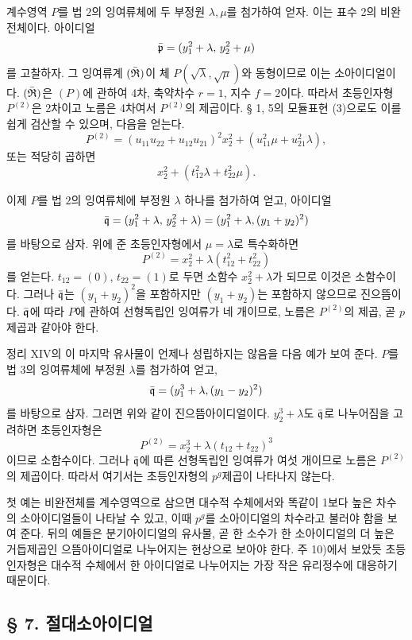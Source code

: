 계수영역 \(P\)를 법 \(2\)의 잉여류체에 두 부정원 \(\lambda,\mu\)를 첨가하여 얻자. 이는 표수 2의 비완전체이다. 아이디얼
\[
 \bar{\mathfrak p}=(y_1^2+\lambda,\,y_2^2+\mu)
\]
를 고찰하자. 그 잉여류계 \((\bar{\mathfrak{R}})\)이 체 \(P(\sqrt\lambda,\sqrt\mu)\)와 동형이므로 이는 소아이디얼이다. \((\bar{\mathfrak{R}})\)은 \((P)\)에 관하여 4차, 축약차수 \(r=1\), 지수 \(f=2\)이다. 따라서 초등인자형 \(P^{(2)}\)은 2차이고 노름은 4차여서 \(P^{(2)}\)의 제곱이다. § 1, 5의 모듈표현 (3)으로도 이를 쉽게 검산할 수 있으며, 다음을 얻는다.
\[
 P^{(2)}=(u_{11}u_{22}+u_{12}u_{21})^2x_2^2+(u_{11}^2\mu+u_{21}^2\lambda),
\]
또는 적당히 곱하면
\[
 x_2^2+(t_{12}^2\lambda+t_{22}^2\mu).
\]

이제 \(P\)를 법 \(2\)의 잉여류체에 부정원 \(\lambda\) 하나를 첨가하여 얻고, 아이디얼
\[
 \bar{\mathfrak q}=(y_1^2+\lambda,\,y_2^2+\lambda)
              =(y_1^2+\lambda,(y_1+y_2)^2)
\]
를 바탕으로 삼자. 위에 준 초등인자형에서 \(\mu=\lambda\)로 특수화하면
\[
 P^{(2)}=x_2^2+\lambda(t_{12}^2+t_{22}^2)
\]
를 얻는다. \(t_{12}=(0)\), \(t_{22}=(1)\)로 두면 소함수 \(x_2^2+\lambda\)가 되므로 이것은 소함수이다. 그러나 \(\bar{\mathfrak q}\)는 \((y_1+y_2)^2\)을 포함하지만 \((y_1+y_2)\)는 포함하지 않으므로 진으뜸이다. \(\bar{\mathfrak q}\)에 따라 \(P\)에 관하여 선형독립인 잉여류가 네 개이므로, 노름은 \(P^{(2)}\)의 제곱, 곧 \(p\)제곱과 같아야 한다.

정리 XIV의 이 마지막 유사물이 언제나 성립하지는 않음을 다음 예가 보여 준다. \(P\)를 법 \(3\)의 잉여류체에 부정원 \(\lambda\)를 첨가하여 얻고,
\[
 \bar{\mathfrak q}=(y_1^3+\lambda,(y_1-y_2)^2)
\]
를 바탕으로 삼자. 그러면 위와 같이 진으뜸아이디얼이다. \(y_2^3+\lambda\)도 \(\bar{\mathfrak q}\)로 나누어짐을 고려하면 초등인자형은
\[
 P^{(2)}=x_2^3+\lambda(t_{12}+t_{22})^3
\]
이므로 소함수이다. 그러나 \(\bar{\mathfrak q}\)에 따른 선형독립인 잉여류가 여섯 개이므로 노름은 \(P^{(2)}\)의 제곱이다. 따라서 여기서는 초등인자형의 \(p^g\)제곱이 나타나지 않는다.

첫 예는 비완전체를 계수영역으로 삼으면 대수적 수체에서와 똑같이 1보다 높은 차수의 소아이디얼들이 나타날 수 있고, 이때 \(p^g\)를 소아이디얼의 차수라고 불러야 함을 보여 준다. 뒤의 예들은 분기아이디얼의 유사물, 곧 한 소수가 한 소아이디얼의 더 높은 거듭제곱인 으뜸아이디얼로 나누어지는 현상으로 보아야 한다. 주 10)에서 보았듯 초등인자형은 대수적 수체에서 한 아이디얼로 나누어지는 가장 작은 유리정수에 대응하기 때문이다.

\subsection*{§ 7. 절대소아이디얼}

